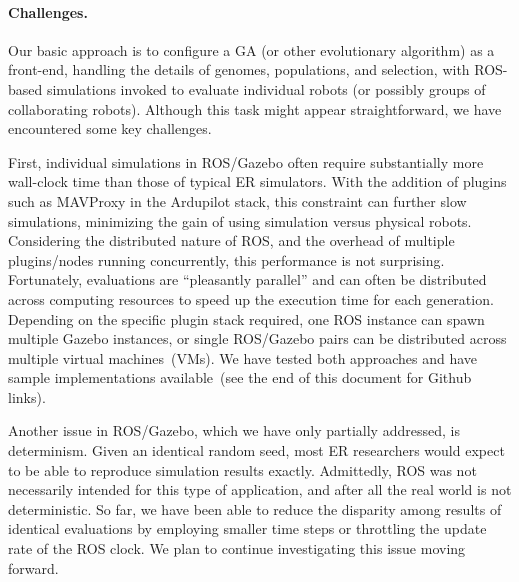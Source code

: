 \paragraph{Challenges.}
Our basic approach is to configure a GA (or other evolutionary algorithm) as a front-end, handling the details of genomes, populations, and selection, with ROS-based simulations invoked to evaluate individual robots (or possibly groups of collaborating robots).  
%
Although this task might appear straightforward, we have encountered some key challenges.

First, individual simulations in ROS/Gazebo often require substantially more wall-clock time than those of typical ER  simulators.  
%
With the addition of plugins such as MAVProxy in the Ardupilot stack, this constraint can further slow simulations, minimizing the gain of using simulation versus physical robots.
%
Considering the distributed nature of ROS, and the overhead of multiple plugins/nodes running concurrently, this performance is not surprising.  
%
Fortunately, evaluations are ``pleasantly parallel'' and can often be 
distributed across computing resources to speed up the execution time for each generation.  
%
Depending on the specific plugin stack required, one ROS instance can spawn 
multiple Gazebo instances, or single ROS/Gazebo pairs can be distributed across multiple virtual machines~(VMs).  
%
We have tested both approaches and have sample implementations available~(see the end of this document for Github links).

Another issue in ROS/Gazebo, which we have only partially addressed, is determinism.  
%
Given an identical random seed, most ER researchers would expect to be able to reproduce simulation results exactly.
%
Admittedly, ROS was not necessarily intended for this type of application, and after all the real world is not deterministic.
%
So far, we have been able to reduce the disparity among results of identical evaluations by employing smaller time steps or throttling the update rate of the ROS clock.  
%
We plan to continue investigating this issue moving forward.
